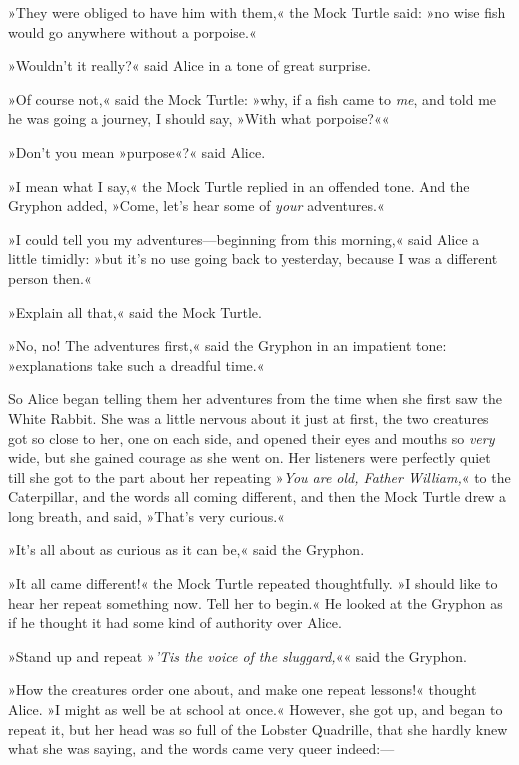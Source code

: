»They were obliged to have him with them,« the Mock Turtle said: »no wise fish would go anywhere without a porpoise.«

»Wouldn't it really?« said Alice in a tone of great surprise.

»Of course not,« said the Mock Turtle: »why, if a fish came to \textit{me}, and told me he was going a journey, I should say, »With what porpoise?««

»Don't you mean »purpose«?« said Alice.

»I mean what I say,« the Mock Turtle replied in an offended tone. And the Gryphon added, »Come, let's hear some of \textit{your} adventures.«


»I could tell you my adventures—beginning from this morning,« said Alice a little timidly: »but it's no use going back to yesterday, because I was a different person then.«

»Explain all that,« said the Mock Turtle.

»No, no! The adventures first,« said the Gryphon in an impatient tone: »explanations take such a dreadful time.«

So Alice began telling them her adventures from the time when she first saw the White Rabbit. She was a little nervous about it just at first, the two creatures got so close to her, one on each side, and opened their eyes and mouths so \textit{very} wide, but she gained courage as she went on. Her listeners were perfectly quiet till she got to the part about her repeating »\textit{You are old, Father William,}« to the Caterpillar, and the words all coming different, and then the Mock Turtle drew a long breath, and said, »That's very curious.«

»It's all about as curious as it can be,« said the Gryphon.

»It all came different!« the Mock Turtle repeated thoughtfully. »I should like to hear her repeat something now. Tell her to begin.« He looked at the Gryphon as if he thought it had some kind of authority over Alice.

»Stand up and repeat »\textit{'Tis the voice of the sluggard,}«« said the Gryphon.



»How the creatures order one about, and make one repeat lessons!« thought Alice. »I might as well be at school at once.« However, she got up, and began to repeat it, but her head was so full of the Lobster Quadrille, that she hardly knew what she was saying, and the words came very queer indeed:—

